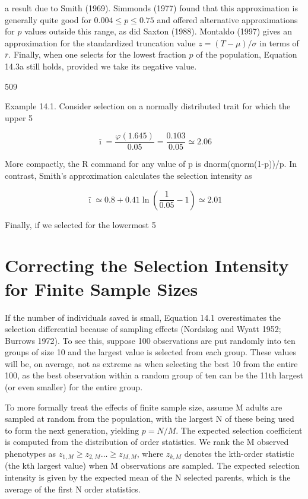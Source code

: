 \documentclass{article}
\begin{document}
a result due to Smith (1969). Simmonds (1977) found that this approximation is generally quite good for  $ 0.004 \leq p \leq 0.75 $ and offered alternative approximations for  $ p $ values outside this range, as did Saxton (1988). Montaldo (1997) gives an approximation for the standardized truncation value  $ z = (T - \mu)/\sigma $ in terms of  $ \bar{r} $. Finally, when one selects for the lowest fraction  $ p $ of the population, Equation 14.3a still holds, provided we take its negative value.

509

Example 14.1. Consider selection on a normally distributed trait for which the upper 5%

\begin{equation}
\bar{\imath}=\frac{\varphi(1.645)}{0.05}=\frac{0.103}{0.05}\simeq2.06
\end{equation}

More compactly, the R command for any value of p is dnorm(qnorm(1-p))/p. In contrast, Smith's approximation calculates the selection intensity as

\begin{equation}
\bar{\imath}\simeq0.8+0.41\ln\left(\frac{1}{0.05}-1\right)\simeq2.01
\end{equation}

Finally, if we selected for the lowermost 5%

\section{Correcting the Selection Intensity for Finite Sample Sizes}
If the number of individuals saved is small, Equation 14.1 overestimates the selection differential because of sampling effects (Nordskog and Wyatt 1952; Burrows 1972). To see this, suppose 100 observations are put randomly into ten groups of size 10 and the largest value is selected from each group. These values will be, on average, not as extreme as when selecting the best 10 from the entire 100, as the best observation within a random group of ten can be the 11th largest (or even smaller) for the entire group.

To more formally treat the effects of finite sample size, assume M adults are sampled at random from the population, with the largest N of these being used to form the next generation, yielding  $ p = N/M $. The expected selection coefficient is computed from the distribution of order statistics. We rank the M observed phenotypes as  $ z_{1,M} \geq z_{2,M} \ldots \geq z_{M,M} $, where  $ z_{k,M} $ denotes the kth-order statistic (the kth largest value) when M observations are sampled. The expected selection intensity is given by the expected mean of the N selected parents, which is the average of the first N order statistics.
\end{document}
